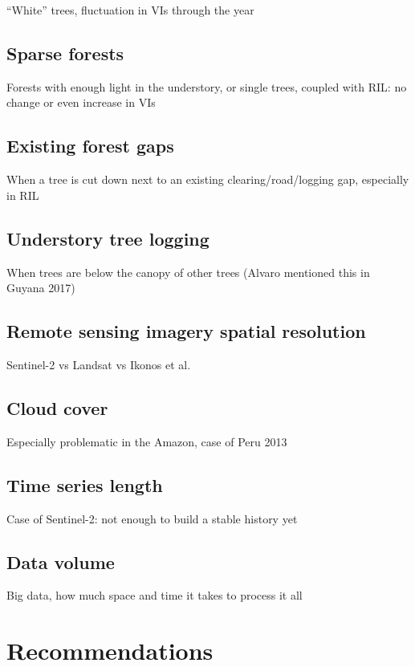 \documentclass[a4paper,12pt]{scrbook}
\begin{document}
``White'' trees, fluctuation in VIs through the year

\subsection{Sparse forests}

Forests with enough light in the understory, or single trees, coupled with \ac{RIL}: no change or even increase in VIs

\subsection{Existing forest gaps}

When a tree is cut down next to an existing clearing/road/logging gap, especially in \ac{RIL}

\subsection{Understory tree logging}

When trees are below the canopy of other trees (Alvaro mentioned this in Guyana 2017)

\subsection{Remote sensing imagery spatial resolution}

Sentinel-2 vs Landsat vs Ikonos et al.

\subsection{Cloud cover}

Especially problematic in the Amazon, case of Peru 2013

\subsection{Time series length}

Case of Sentinel-2: not enough to build a stable history yet

\subsection{Data volume}

Big data, how much space and time it takes to process it all

\section{Recommendations}
\end{document}
